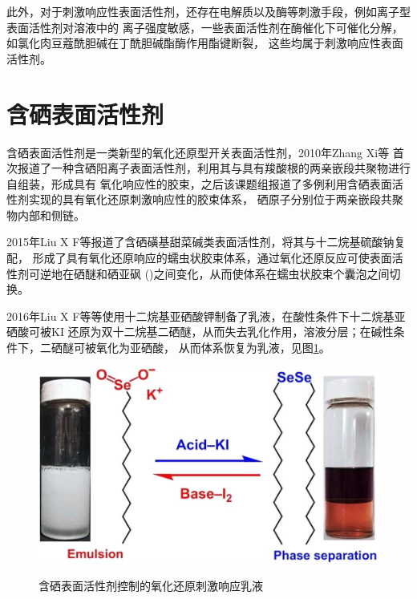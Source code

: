 \documentclass[bachelor,winfonts,replaceperiod]{jnuthesis}
\begin{document}
    此外，对于刺激响应性表面活性剂，还存在电解质以及酶等刺激手段，例如离子型表面活性剂对溶液中的
    离子强度敏感，一些表面活性剂在酶催化下可催化分解，如氯化肉豆蔻酰胆碱在丁酰胆碱酯酶作用酯键断裂\cite{guo2012}，
    这些均属于刺激响应性表面活性剂。
    
%    
    
    
    \section{含硒表面活性剂}
    含硒表面活性剂是一类新型的氧化还原型开关表面活性剂，2010年Zhang Xi等\cite{zhangxi2010,zhangxi20102}
    首次报道了一种含硒阳离子表面活性剂，利用其与具有羧酸根的两亲嵌段共聚物进行自组装，形成具有
    氧化响应性的胶束，之后该课题组报道了多例利用含硒表面活性剂实现的具有氧化还原刺激响应性的胶束体系，
    硒原子分别位于两亲嵌段共聚物内部和侧链。
    
    2015年Liu X F等\cite{zhang2015}报道了含硒磺基甜菜碱类表面活性剂，将其与十二烷基硫酸钠复配，
    形成了具有氧化还原响应的蠕虫状胶束体系，通过氧化还原反应可使表面活性剂可逆地在硒醚和硒亚砜
    ()之间变化，从而使体系在蠕虫状胶束个囊泡之间切换。
    
    2016年Liu X F等\cite{zhang2016}等使用十二烷基亚硒酸钾制备了乳液，在酸性条件下十二烷基亚硒酸可被KI
    还原为双十二烷基二硒醚，从而失去乳化作用，溶液分层；在碱性条件下，二硒醚可被氧化为亚硒酸，
    从而体系恢复为乳液，见图\ref{fig:switchable-selenium}。 
    \begin{figure}[htbp]
        \centering
        \includegraphics[scale=0.8]{figure/switchable-selenium.jpg}\\
        \caption{含硒表面活性剂控制的氧化还原刺激响应乳液\cite{zhang2016}}\label{fig:switchable-selenium}
    \end{figure}
\end{document}
